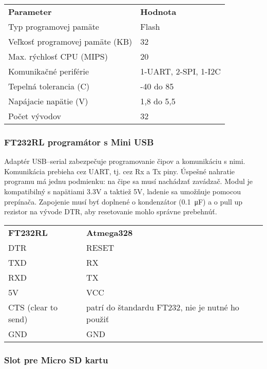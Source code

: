 \documentclass[titlepage]{article}
\begin{document}
\begin{table}[htb]
\begin{tabular}{ll}
\textbf{Parameter}              & \textbf{Hodnota}     \\
Typ programovej pamäte          & Flash                \\
Veľkosť programovej pamäte (KB) & 32                   \\
Max. rýchlosť CPU (MIPS)        & 20                   \\
Komunikačné periférie           & 1-UART, 2-SPI, 1-I2C \\
Tepelná tolerancia (C)          & -40 do 85            \\
Napájacie napätie (V)           & 1,8 do 5,5           \\
Počet vývodov                   & 32                  
\end{tabular}
\end{table}

\subsubsection{FT232RL programátor s Mini USB}
Adaptér USB–serial zabezpečuje programovanie čipov a komunikáciu s nimi. Komunikácia prebieha cez UART, tj. cez Rx a Tx piny. Úspešné nahratie programu má jednu podmienku: na čipe sa musí nachádzať zavádzač. Modul je kompatibilný s napätiami 3.3V a taktiež 5V, ladenie sa umožňuje pomocou prepínača. Zapojenie musí byť doplnené o kondenzátor (\SI{0,1}{\micro\F}) a o pull up rezistor na vývode DTR, aby resetovanie mohlo správne prebehnúť.

\begin{table}[htb]
\begin{tabular}{ll}
\textbf{FT232RL}  	& \textbf{Atmega328}   \\
DTR          		& RESET                \\
TXD			 		& RX                   \\
RXD					& TX				   \\
5V					& VCC				   \\
CTS (clear to send) & patrí do štandardu FT232, nie je nutné ho použiť \\
GND					& GND
\end{tabular}
\end{table}


\newpage
\subsubsection{Slot pre Micro SD kartu}
\end{document}
